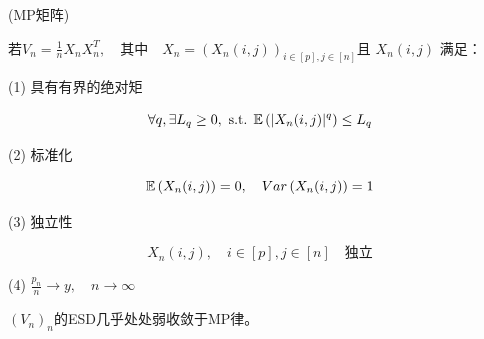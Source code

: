\begin{definition}{(MP矩阵)}

\(若V_n = \frac{1}{n} X_n X_n^T, \quad \text{其中} \quad X_n = \left( X_n(i,j) \right)_{i \in [p], j \in [n]}\)且 \(X_n(i,j)\) 满足：

(1) 具有有界的绝对矩

\begin{equation*}
\forall q, \exists L_q \geq 0, \text{ s.t. } \mathbb{E}\left( |X_n(i,j)|^q \right) \leq L_q
\end{equation*}

(2) 标准化

\begin{equation*}
\mathbb{E}\left( X_n(i,j) \right) = 0, \quad Var\left( X_n(i,j) \right) = 1
\end{equation*}

(3) 独立性

\begin{equation*}
X_n(i,j), \quad i \in [p], j \in [n] \quad \text{独立}
\end{equation*}

(4) \(\frac{p_n}{n} \to y, \quad n \to \infty\)

\end{definition}

\begin{theorem}
    $(V_n)_n$的ESD几乎处处弱收敛于MP律。
\end{theorem}